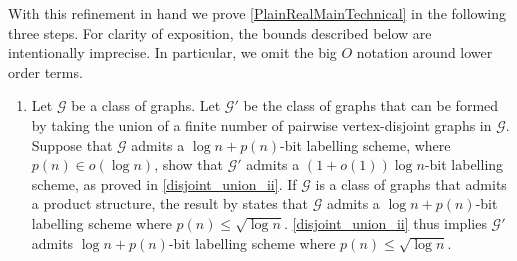 With this refinement in hand we prove \cref{PlainRealMainTechnical} in the following three steps. For clarity of exposition, the bounds described below are intentionally imprecise. In particular, we omit the big $O$ notation around lower order terms.

\begin{enumerate}[label=\rm(\alph*)]
  \item \label{step:union-closed}
        Let $\mathcal{G}$ be a class of graphs.
        Let $\mathcal{G}'$ be the class of graphs that can be formed by taking the union of a finite number of pairwise vertex-disjoint graphs in $\mathcal{G}$.
        Suppose that $\mathcal{G}$ admits a $\log n + p(n)$-bit labelling scheme, where $p(n)\in o(\log n)$, show that $\mathcal{G}'$ admits a $(1+o(1))\log n$-bit labelling scheme, as proved in \cref{disjoint_union_ii}.    If  $\mathcal{G}$ is a class of graphs that admits a product structure, the result by \citet{dujmovic.esperet.ea:adjacency} states that $\mathcal{G}$ admits a $\log n + p(n)$-bit labelling scheme where $p(n)\leq \sqrt{\log n}$. \cref{disjoint_union_ii} thus implies $\mathcal{G}'$  admits $\log n + p(n)$-bit
         labelling scheme where $p(n)\leq \sqrt{\log n}$.


\end{enumerate}
